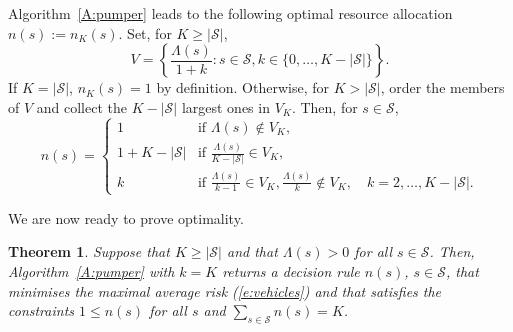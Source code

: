 \documentclass[twoside,11pt]{article}
\newtheorem{theorem}{Theorem}[section]
\begin{document}
Algorithm~\ref{A:pumper} leads to the following 
optimal resource allocation $n(s) := n_K(s)$. Set, for 
$K \geq |\mathcal{S}|$,
\[
V = \left\{ \frac{\Lambda(s)}{1+k} : s \in \mathcal{S}, 
 k \in \{  0, \dots, K-|\mathcal{S}| \} \right\}.
\]
If $K = |\mathcal{S}|$, $n_K(s) = 1$ by definition. Otherwise,
for $K > |\mathcal{S}|$, order the members of $V$ and collect the 
$K-|\mathcal{S}|$ largest ones in $V_K$. Then, for $s\in\mathcal{S}$,
\begin{equation}
n(s) = \left\{ \begin{array}{ll}
    1 &  \mbox{if } \Lambda(s) \not \in V_K, \\
   1 + K-|\mathcal{S}|  & \mbox{if } 
   \frac{\Lambda(s)}{K-|\mathcal{S}|} \in V_K, \\
   k  & \mbox{if } \frac{\Lambda(s)}{k-1} \in V_K,
      \frac{\Lambda(s)}{k} \not \in V_K, \quad k=2, \dots, K-|\mathcal{S}|.
\end{array} \right.
\label{e:pumper}
\end{equation}

We are now ready to prove optimality.

\begin{theorem} \label{t:cars}
Suppose that $K \geq |\mathcal{S}|$ and that $\Lambda(s) > 0$
for all $s\in \mathcal{S}$. Then, Algorithm~\ref{A:pumper} with
$k=K$ returns a decision rule $n(s)$, $s\in \mathcal{S}$, that 
minimises the maximal average risk (\ref{e:vehicles}) and that 
satisfies the constraints  $1\leq n(s)$ for all $s$ and 
$\sum_{s\in\mathcal{S}} n(s) = K$.
\end{theorem}
\end{document}
